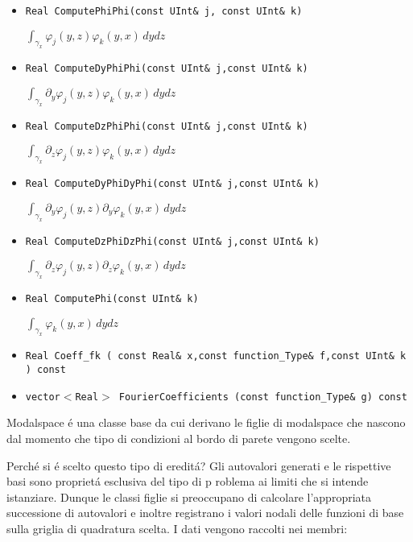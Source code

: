 \begin{itemize}
\item \texttt{Real ComputePhiPhi(const UInt\& j, const UInt\& k)}

 $\int_{\gamma_x}\varphi_j(y,z)\varphi_k(y,x) \,dydz$

\item \texttt{Real ComputeDyPhiPhi(const UInt\& j,const UInt\& k)} 

$\int_{\gamma_x} \partial_y \varphi_j(y,z)\varphi_k(y,x) \,dydz$

\item \texttt{Real ComputeDzPhiPhi(const UInt\& j,const UInt\& k)} 

$\int_{\gamma_x} \partial_z \varphi_j(y,z)\varphi_k(y,x) \,dydz$

\item \texttt{Real ComputeDyPhiDyPhi(const UInt\& j,const UInt\& k)} 

$\int_{\gamma_x} \partial_y \varphi_j(y,z)\partial_y\varphi_k(y,x) \,dydz$

\item \texttt{Real ComputeDzPhiDzPhi(const UInt\& j,const UInt\& k)} 

$\int_{\gamma_x} \partial_z \varphi_j(y,z)\partial_z\varphi_k(y,x) \,dydz$

\item \texttt{Real ComputePhi(const UInt\& k)} 

$\int_{\gamma_x} \varphi_k(y,x) \,dydz$

\item \texttt{Real Coeff\_fk (	const Real\& x,const function\_Type\& f,const UInt\& k ) const}

\item \texttt{vector$<$Real$>$ FourierCoefficients (const function\_Type\& g) const}
\end{itemize}




Modalspace \'e una classe base da cui derivano le figlie di modalspace che nascono dal momento che tipo di condizioni al bordo di parete vengono scelte.

Perch\'e si \'e scelto questo tipo di eredit\'a? Gli autovalori generati e le rispettive basi sono propriet\'a esclusiva del tipo di p roblema ai limiti che si intende istanziare. Dunque le classi figlie si preoccupano di calcolare l'appropriata successione di autovalori e inoltre registrano i valori nodali delle funzioni di base sulla griglia di quadratura scelta. I dati vengono raccolti nei membri:

